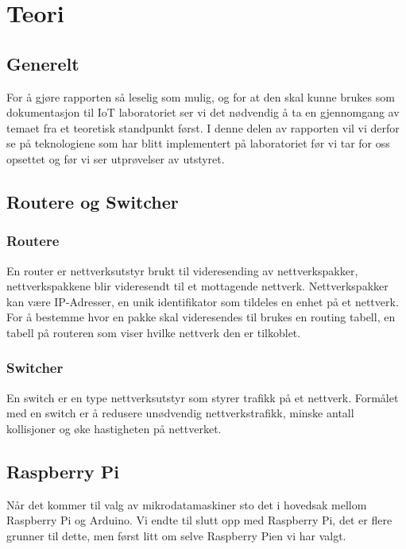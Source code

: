 \documentclass{article}
\begin{document}


\newpage
\section{Teori}

\subsection{Generelt}
For å gjøre rapporten så leselig som mulig, og for at den skal kunne brukes som dokumentasjon til IoT laboratoriet ser vi det nødvendig å ta en gjennomgang av temaet fra et teoretisk standpunkt først. I denne delen av rapporten vil vi derfor se på teknologiene som har blitt implementert på laboratoriet  før vi tar for oss opsettet og før vi ser utprøvelser av utstyret.

\subsection{Routere og Switcher}

\subsubsection{Routere}
En router er nettverksutstyr brukt til videresending av nettverkspakker, nettverkspakkene blir videresendt til et mottagende nettverk. Nettverkspakker kan være IP-Adresser, en unik identifikator som tildeles en enhet på et nettverk. For å bestemme hvor en pakke skal videresendes til brukes en routing tabell, en tabell på routeren som viser hvilke nettverk den er tilkoblet.

\subsubsection{Switcher}
En switch er en type nettverksutstyr som styrer trafikk på et nettverk. Formålet med en switch er å redusere unødvendig nettverkstrafikk, minske antall kollisjoner og øke hastigheten på nettverket.

\subsection{Raspberry Pi}
Når det kommer til valg av mikrodatamaskiner sto det i hovedsak mellom Raspberry Pi og Arduino. Vi endte til slutt opp med Raspberry Pi, det er flere grunner til dette, men først litt om selve Raspberry Pien vi har valgt.
\end{document}
